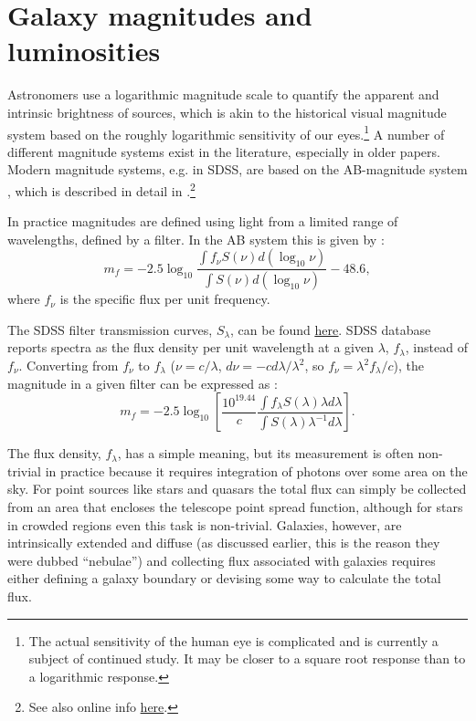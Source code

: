 \section{Galaxy magnitudes and luminosities}

Astronomers use a logarithmic magnitude scale to quantify the apparent and intrinsic brightness of sources, which is akin to the historical visual magnitude system based on the roughly logarithmic sensitivity of our eyes.\footnote{The actual sensitivity of the human eye is complicated and is currently a subject of continued study. It may be closer to a square root response than to a logarithmic response.}
A number of different magnitude systems exist in the literature, especially in older papers. Modern magnitude systems, e.g. in SDSS, are based on the AB-magnitude system \href{http://adsabs.harvard.edu/abs/1983ApJ...266..713O}{\citep{oke_gunn83}}, which is described in detail in \href{http://adsabs.harvard.edu/abs/1996AJ....111.1748F}{\citet{fukugita_etal96}}.\footnote{See also online info  \href{http://classic.sdss.org/dr3/algorithms/fluxcal.html}{here}.}

In practice magnitudes are defined using light from a limited range of wavelengths, defined by a filter. In the AB system this is given by \href{http://adsabs.harvard.edu/abs/1996AJ....111.1748F}{\citep[][]{fukugita_etal96}}:
\begin{equation}
m_f =-2.5\log_{10}\frac{\int f_{\nu}S(\nu) d(\log_{10}\nu)}{\int S({\nu}) d(\log_{10}\nu)} - 48.6,
\label{eq:magforcolorAB}
\end{equation}
where $f_\nu$ is the specific flux per unit frequency.

The SDSS filter transmission curves, $S_\lambda$, can be found \href{http://classic.sdss.org/dr7/instruments/imager/filters/}{\underline{here}}.  SDSS database reports spectra as the flux density per unit wavelength at a given $\lambda$, $f_\lambda$,  instead of $f_\nu$.  Converting from $f_\nu$ to $f_\lambda$  ($\nu=c/\lambda$, $d\nu=-cd\lambda/\lambda^2$, so $f_\nu=\lambda^2 f_\lambda/c$), the magnitude in a given 
filter can be expressed as  \href{http://adsabs.harvard.edu/abs/2006MNRAS.371..121S}{\citep[see, e.g., eqs 2 and 3 in][]{smolcic_etal06}}:
\begin{equation}
m_f =-2.5\log_{10}\left[\frac{10^{19.44}}{c}\frac{\int f_{\lambda}S(\lambda)\lambda d\lambda}{\int S({\lambda})\lambda^{-1} d\lambda}\right].
\label{eq:magforcolor}
\end{equation}

The flux density, $f_\lambda$, has a simple meaning, but its measurement is often non-trivial in practice because it requires integration of photons over some area on the sky. For point sources like stars and quasars the total flux can simply be collected from an area that encloses the telescope point spread function, although for stars in crowded regions even this task is non-trivial. Galaxies, however, are intrinsically extended and diffuse (as discussed earlier, this is the reason they were dubbed ``nebulae'') and collecting flux associated with galaxies requires either defining a galaxy boundary or devising some way to calculate the total flux. 

